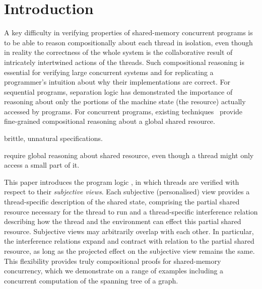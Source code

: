 \section{Introduction}





A key difficulty in verifying properties of shared-memory concurrent
programs is to be able to reason compositionally about each thread in
isolation, even though in reality the correctness of the whole system
is the collaborative result of intricately intertwined actions of the
threads.  Such compositional reasoning is essential for verifying
large concurrent systems and for replicating a programmer's intuition
about why their implementations are correct. For sequential programs,
separation logic has demonstrated the importance of reasoning about
only the portions of the machine state (the resource) actually
accessed by programs. For concurrent programs, existing
techniques~\cite{lotsofthem} provide fine-grained compositional
reasoning about a global shared resource.

brittle, unnatural specifications. 

require global reasoning
about shared resource, even though a thread might only access a small
part of it.

This paper introduces the program logic \colosl, in which threads are
verified with respect to their \emph{subjective views}. Each
subjective (personalised) view provides a thread-specific description
of the shared state, comprising the partial shared resource necessary
for the thread to run and a thread-specific interference relation
describing how the thread and the environment can effect this partial
shared resource. Subjective views may arbitrarily overlap with each
other.  In particular, the interference relations expand and contract
with relation to the partial shared resource, as long as the projected
effect on the subjective view remains the same.  This flexibility
provides truly compositional proofs for shared-memory concurrency,
which we demonstrate on a range of examples including a concurrent
computation of the spanning tree of a graph.


